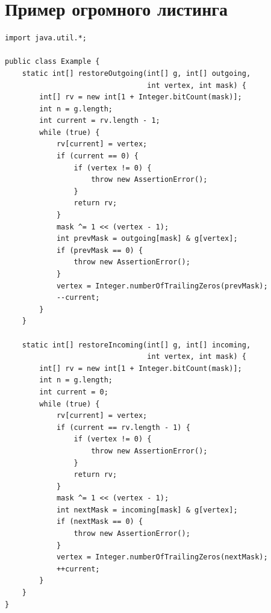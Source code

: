 \documentclass[specification,annotation,times]{itmo-student-thesis.cls}
\begin{document}
\chapter{Пример огромного листинга}

\begin{lstlisting}[caption={Пример большого листинга},label={lstX}]
import java.util.*;

public class Example {
    static int[] restoreOutgoing(int[] g, int[] outgoing,
                                 int vertex, int mask) {
        int[] rv = new int[1 + Integer.bitCount(mask)];
        int n = g.length;
        int current = rv.length - 1;
        while (true) {
            rv[current] = vertex;
            if (current == 0) {
                if (vertex != 0) {
                    throw new AssertionError();
                }
                return rv;
            }
            mask ^= 1 << (vertex - 1);
            int prevMask = outgoing[mask] & g[vertex];
            if (prevMask == 0) {
                throw new AssertionError();
            }
            vertex = Integer.numberOfTrailingZeros(prevMask);
            --current;
        }
    }

    static int[] restoreIncoming(int[] g, int[] incoming,
                                 int vertex, int mask) {
        int[] rv = new int[1 + Integer.bitCount(mask)];
        int n = g.length;
        int current = 0;
        while (true) {
            rv[current] = vertex;
            if (current == rv.length - 1) {
                if (vertex != 0) {
                    throw new AssertionError();
                }
                return rv;
            }
            mask ^= 1 << (vertex - 1);
            int nextMask = incoming[mask] & g[vertex];
            if (nextMask == 0) {
                throw new AssertionError();
            }
            vertex = Integer.numberOfTrailingZeros(nextMask);
            ++current;
        }
    }
}
\end{lstlisting}
                
\end{document}
